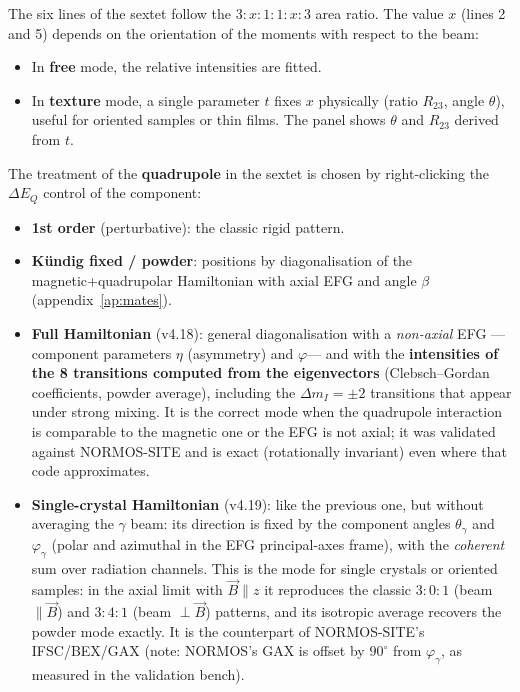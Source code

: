 The six lines of the sextet follow the $3:x:1:1:x:3$ area ratio. The value
$x$ (lines 2 and 5) depends on the orientation of the moments with respect to the beam:

\begin{itemize}[nosep]
  \item In \textbf{free} mode, the relative intensities are fitted.
  \item In \textbf{texture} mode, a single parameter $t$ fixes $x$ physically
        (ratio $R_{23}$, angle $\theta$), useful for oriented samples or
        thin films. The panel shows $\theta$ and $R_{23}$ derived from $t$.
\end{itemize}

The treatment of the \textbf{quadrupole} in the sextet is chosen by
right-clicking the $\Delta E_Q$ control of the component:

\begin{itemize}[nosep]
  \item \textbf{1st order} (perturbative): the classic rigid pattern.
  \item \textbf{Kündig fixed / powder}: positions by diagonalisation of the
        magnetic+quadrupolar Hamiltonian with axial EFG and angle $\beta$
        (appendix~\ref{ap:mates}).
  \item \textbf{Full Hamiltonian} (v4.18): general diagonalisation with a
        \emph{non-axial} EFG —component parameters $\eta$ (asymmetry) and
        $\varphi$— and with the \textbf{intensities of the 8 transitions
        computed from the eigenvectors} (Clebsch--Gordan coefficients, powder
        average), including the $\Delta m_I = \pm 2$ transitions that appear
        under strong mixing. It is the correct mode when the quadrupole
        interaction is comparable to the magnetic one or the EFG is not axial;
        it was validated against NORMOS-SITE and is exact (rotationally
        invariant) even where that code approximates.
  \item \textbf{Single-crystal Hamiltonian} (v4.19): like the previous one,
        but without averaging the $\gamma$ beam: its direction is fixed by
        the component angles $\theta_\gamma$ and $\varphi_\gamma$ (polar
        and azimuthal in the EFG principal-axes frame), with the
        \emph{coherent} sum over radiation channels. This is the mode for
        single crystals or oriented samples: in the axial limit with
        $\vec B \parallel z$ it reproduces the classic
        $3\!:\!0\!:\!1$ (beam $\parallel \vec B$) and $3\!:\!4\!:\!1$
        (beam $\perp \vec B$) patterns, and its isotropic average recovers
        the powder mode exactly. It is the counterpart of NORMOS-SITE's
        IFSC/BEX/GAX (note: NORMOS's GAX is offset by $90^\circ$ from
        $\varphi_\gamma$, as measured in the validation bench).
\end{itemize}

